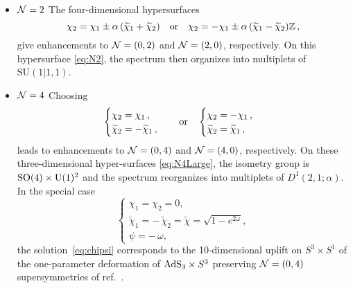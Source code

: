 \documentclass[a4paper, 11pt]{article}
\numberwithin{equation}{section}
\newcommand{\ts}[1]{\widetilde{#1}}
\newcommand{\SU}[1]{\mathrm{SU}( #1 )}
\newcommand{\SO}[1]{\mathrm{SO}( #1 )}
\newcommand{\+}{\oplus}
\begin{document}
\begin{itemize}
	\item {\boldmath ${\cal N}=2$} The four-dimensional hypersurfaces
	\begin{equation} \label{eq:N2}
		\chi_{2} = \chi_{1} \pm\alpha\,(\ts{\chi}_{1}+\ts{\chi}_{2})
		\quad {\rm or}\quad \chi_{2} = -\chi_{1} \pm\alpha\,(\ts{\chi}_{1}-\ts{\chi}_{2}) \mathbb{Z}
		\,,
	\end{equation}
	give enhancements to ${\cal N}=(0,2)$ and ${\cal N}=(2,0)$, respectively. On this hypersurface \eqref{eq:N2}, the spectrum then organizes into multiplets of $\SU{1\vert1,1}$.
	\item {\boldmath ${\cal N}=4$} Choosing
	\begin{equation} \label{eq:N4Large}
		\begin{cases}
			\chi_{2} = \chi_{1}\,,\\
			\ts{\chi}_{2} = -\ts{\chi}_{1}\,,
		\end{cases}
		\quad {\rm or }\quad
		\begin{cases}
			\chi_{2} = - \chi_{1}\,,\\
			\ts{\chi}_{2} = \ts{\chi}_{1}\,,
		\end{cases}
	\end{equation}
	leads to enhancements to ${\cal N}=(0,4)$ and ${\cal N}=(4,0)$, respectively. On these three-dimensional hyper-surfaces \eqref{eq:N4Large}, the isometry group is $\SO{4}\times {\rm U}(1)^{2}$ and the spectrum reorganizes into multiplets of $D^{1}(2,1;\alpha)$. In the special case
	\begin{equation} \label{eq:limittoT4}
		\begin{cases}
			\chi_{1}=\chi_{2}= 0,\\
			\ts{\chi}_{1}=-\,\ts{\chi}_{2}=\ts{\chi}=\sqrt{1-e^{2\omega}},\\
			\psi = -\,\omega,
		\end{cases}
	\end{equation}
	the solution~\eqref{eq:chipsi} corresponds to the 10-dimensional uplift on $S^{3}\times S^{1}$ of the one-parameter deformation of ${\rm AdS}_{3}\times S^{3}$ preserving ${\cal N}=(0,4)$ supersymmetries of ref.~\cite{Eloy:2021fhc}.
	

\end{itemize}
\end{document}
